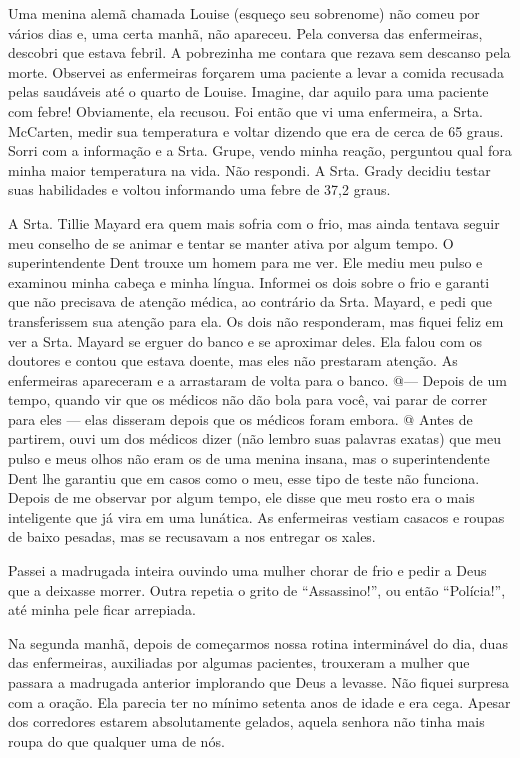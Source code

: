 Uma menina alemã chamada Louise (esqueço seu sobrenome) não comeu por
vários dias e, uma certa manhã, não apareceu. Pela conversa das
enfermeiras, descobri que estava febril. A pobrezinha me contara que
rezava sem descanso pela morte. Observei as enfermeiras forçarem uma
paciente a levar a comida recusada pelas saudáveis até o quarto de
Louise. Imagine, dar aquilo para uma paciente com febre! Obviamente, ela
recusou. Foi então que vi uma enfermeira, a Srta. McCarten, medir sua
temperatura e voltar dizendo que era de cerca de 65 graus. Sorri com a
informação e a Srta. Grupe, vendo minha reação, perguntou qual fora
minha maior temperatura na vida. Não respondi. A Srta. Grady decidiu
testar suas habilidades e voltou informando uma febre de 37,2 graus.

A Srta. Tillie Mayard era quem mais sofria com o frio, mas ainda tentava
seguir meu conselho de se animar e tentar se manter ativa por algum
tempo. O superintendente Dent trouxe um homem para me ver. Ele mediu meu
pulso e examinou minha cabeça e minha língua. Informei os dois sobre o
frio e garanti que não precisava de atenção médica, ao contrário da
Srta. Mayard, e pedi que transferissem sua atenção para ela. Os dois não
responderam, mas fiquei feliz em ver a Srta. Mayard se erguer do banco e
se aproximar deles. Ela falou com os doutores e contou que estava
doente, mas eles não prestaram atenção. As enfermeiras apareceram e a
arrastaram de volta para o banco. @--- Depois de um tempo, quando vir
que os médicos não dão bola para você, vai parar de correr para eles ---
elas disseram depois que os médicos foram embora. @ Antes de partirem,
ouvi um dos médicos dizer (não lembro suas palavras exatas) que meu
pulso e meus olhos não eram os de uma menina insana, mas o
superintendente Dent lhe garantiu que em casos como o meu, esse tipo de
teste não funciona. Depois de me observar por algum tempo, ele disse que
meu rosto era o mais inteligente que já vira em uma lunática. As
enfermeiras vestiam casacos e roupas de baixo pesadas, mas se recusavam
a nos entregar os xales.

Passei a madrugada inteira ouvindo uma mulher chorar de frio e pedir a
Deus que a deixasse morrer. Outra repetia o grito de ``Assassino!'', ou
então ``Polícia!'', até minha pele ficar arrepiada.

Na segunda manhã, depois de começarmos nossa rotina interminável do dia,
duas das enfermeiras, auxiliadas por algumas pacientes, trouxeram a
mulher que passara a madrugada anterior implorando que Deus a levasse.
Não fiquei surpresa com a oração. Ela parecia ter no mínimo setenta anos
de idade e era cega. Apesar dos corredores estarem absolutamente
gelados, aquela senhora não tinha mais roupa do que qualquer uma de nós.

